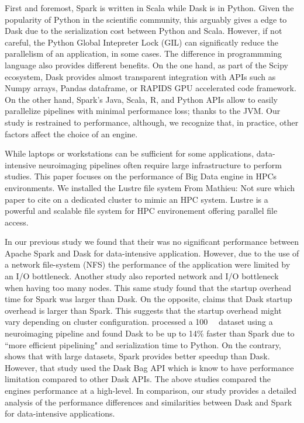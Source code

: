 \documentclass[conference]{IEEEtran}
\newcommand{\MD}[1]{\color{magenta}From Mathieu: #1 \color{black}}
\begin{document}
First and foremost, Spark is written in Scala while Dask is in Python.
Given the popularity of Python in the scientific community, this arguably gives a edge to Dask due to the serialization cost between Python and Scala.
However, if not careful, the Python Global Intepreter Lock (GIL) can significatly reduce the parallelism of an application, in some cases.
The difference in programmming language also provides different benefits.
On the one hand, as part of the Scipy ecosystem, Dask provides almost transparent integration with APIs such as Numpy arrays, Pandas dataframe, or RAPIDS GPU accelerated code framework.
On the other hand, Spark's Java, Scala, R, and Python APIs allow to easily parallelize pipelines with minimal performance loss; thanks to the JVM.
Our study is restrained to performance, although, we recognize that, in practice, other factors affect the choice of an engine.

While laptops or workstations can be sufficient for some applications, data-intensive neuroimaging pipelines often require large infrastructure to perform studies.
This paper focuses on the performance of Big Data engine in HPCs environments.
We installed the Lustre file system \MD{Not sure which paper to cite} on a dedicated cluster to mimic an HPC system.
Lustre is a powerful and scalable file system for HPC environement offering parallel file access.

In our previous study\cite{8943502} we found that their was no significant performance between Apache Spark and Dask for data-intensive application.
However, due to the use of a network file-system (NFS) the performance of the application were limited by an I/O bottleneck.
Another study \cite{8588652} also reported network and I/O bottleneck when having too many nodes.
This same study found that the startup overhead time for Spark was larger than Dask.
On the opposite, \cite{Mehta:17} claims that Dask startup overhead is larger than Spark.
This suggests that the startup overhead might vary depending on cluster configuration.
\cite{Mehta:17} processed a \SI{100}{\giga\byte} dataset using a neuroimaging pipeline and found Dask to be up to 14\% faster than Spark due to ``more efficient pipelining" and serialization time to Python.
On the contrary, \cite{10.1145/3225058.3225128} shows that with large datasets, Spark provides better speedup than Dask.
However, that study used the Dask Bag API which is know to have performance limitation compared to other Dask APIs.
The above studies compared the engines performance at a high-level.
In comparison, our study provides a detailed analysis of the performance differences and similarities between Dask and Spark for data-intensive applications.
\end{document}
